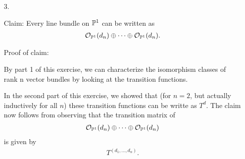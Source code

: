 \begin{exercise}{2}
\begin{enumerate}
    \item[3.]{
        Claim: Every line bundle on $\mathbb{P}^1$ can be written as 
        \begin{align*}
            \mathcal{O}_{\mathbb{P}^1}(d_n)\oplus \dots \oplus \mathcal{O}_{\mathbb{P} ^1}(d_n).
        \end{align*}
        
        Proof of claim:

        By part 1 of this exercise, we can characterize the isomorphism classes of rank n vector bundles by looking at the transition functions. 

        In the second part of this exercise, we showed that (for $n=2$, but actually inductively for all $n$) these 
        transition functions can be writte as $T^d$. The claim now follows from observing that the transition matrix of 
        \begin{align*}
            \mathcal{O}_{\mathbb{P}^1}(d_n)\oplus \dots \oplus \mathcal{O}_{\mathbb{P} ^1}(d_n)
        \end{align*}
        is given by
        \begin{align*}
            T^{(d_1,\dots, d_n)}.
        \end{align*}
    }
    \end{enumerate}
\end{exercise}


